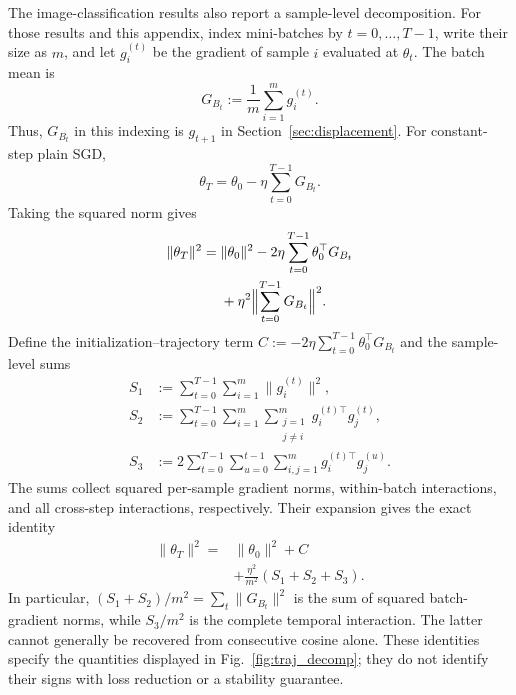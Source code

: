 The image-classification results also report a sample-level decomposition.
For those results and this appendix, index mini-batches by $t=0,\ldots,T-1$,
write their size as $m$, and let $g_i^{(t)}$ be the gradient of sample $i$
evaluated at $\theta_t$. The batch mean is
\[
  G_{B_t}:=\frac{1}{m}\sum_{i=1}^m g_i^{(t)}.
\]
Thus, $G_{B_t}$ in this indexing is $g_{t+1}$ in
Section~\ref{sec:displacement}. For constant-step plain SGD,
\begin{equation}
  \theta_T=\theta_0-\eta\sum_{t=0}^{T-1}G_{B_t}.
  \label{eq:final_theta_expression}
\end{equation}
Taking the squared norm gives
\begin{equation}
\begin{aligned}
\|\theta_T\|^2={}&\|\theta_0\|^2
 -2\eta\sum_{t=0}^{T-1}\theta_0^\top G_{B_t}\\
 &+\eta^2\Bigl\|\sum_{t=0}^{T-1}G_{B_t}\Bigr\|^2.
\end{aligned}
\label{eq:norm_split_terms}
\end{equation}
Define the initialization--trajectory term
$C:=-2\eta\sum_{t=0}^{T-1}\theta_0^\top G_{B_t}$ and the sample-level sums
\begin{equation}
\begin{aligned}
S_1&:=\sum_{t=0}^{T-1}\sum_{i=1}^m\|g_i^{(t)}\|^2,\\
S_2&:=\sum_{t=0}^{T-1}\sum_{i=1}^m
       \sum_{\substack{j=1\\j\ne i}}^m g_i^{(t)\top}g_j^{(t)},\\
S_3&:=2\sum_{t=0}^{T-1}\sum_{u=0}^{t-1}
       \sum_{i,j=1}^m g_i^{(t)\top}g_j^{(u)}.
\end{aligned}
\label{eq:s_def}
\end{equation}
The sums collect squared per-sample gradient norms, within-batch interactions,
and all cross-step interactions, respectively. Their expansion gives the exact
identity
\begin{equation}
\begin{aligned}
\|\theta_T\|^2={}&\|\theta_0\|^2+C\\
 &+\frac{\eta^2}{m^2}(S_1+S_2+S_3).
\end{aligned}
\label{eq:thetaT_full}
\end{equation}
In particular, $(S_1+S_2)/m^2=\sum_t\|G_{B_t}\|^2$ is the sum of squared
batch-gradient norms, while $S_3/m^2$ is the complete temporal interaction. The
latter cannot generally be recovered from consecutive cosine alone. These
identities specify the quantities displayed in Fig.~\ref{fig:traj_decomp}; they do not
identify their signs with loss reduction or a stability guarantee.

